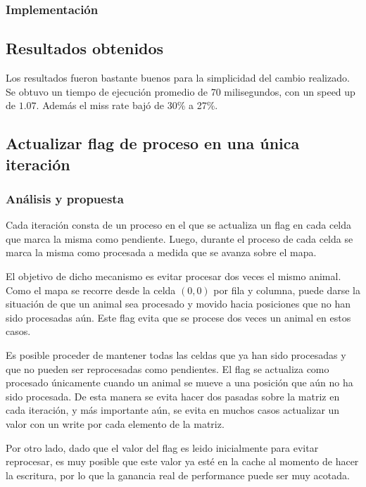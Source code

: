 \documentclass[a4paper,11pt]{article}
\begin{document}
\subsubsection{Implementación}



\subsection{Resultados obtenidos}

Los resultados fueron bastante buenos para la simplicidad del cambio realizado.
Se obtuvo un tiempo de ejecución promedio de 70 milisegundos, con un speed up
de \(1.07\). Además el miss rate bajó de 30\% a 27\%.

\subsection{Actualizar flag de proceso en una única iteración}

\subsubsection{Análisis y propuesta}

Cada iteración consta de un proceso en el que se actualiza un flag en cada
celda que marca la misma como pendiente. Luego, durante el proceso de cada
celda se marca la misma como procesada a medida que se avanza sobre el mapa.

El objetivo de dicho mecanismo es evitar procesar dos veces el mismo animal.
Como el mapa se recorre desde la celda \((0, 0)\) por fila y columna, puede
darse la situación de que un animal sea procesado y movido hacia posiciones que
no han sido procesadas aún. Este flag evita que se procese dos veces un animal
en estos casos.

Es posible proceder de mantener todas las celdas que ya han sido procesadas y
que no pueden ser reprocesadas como pendientes. El flag se actualiza como
procesado únicamente cuando un animal se mueve a una posición que aún no ha
sido procesada. De esta manera se evita hacer dos pasadas sobre la matriz en
cada iteración, y más importante aún, se evita en muchos casos actualizar un
valor con un write por cada elemento de la matriz.

Por otro lado, dado que el valor del flag es leido inicialmente para evitar
reprocesar, es muy posible que este valor ya esté en la cache al momento de
hacer la escritura, por lo que la ganancia real de performance puede ser muy
acotada.
\end{document}
